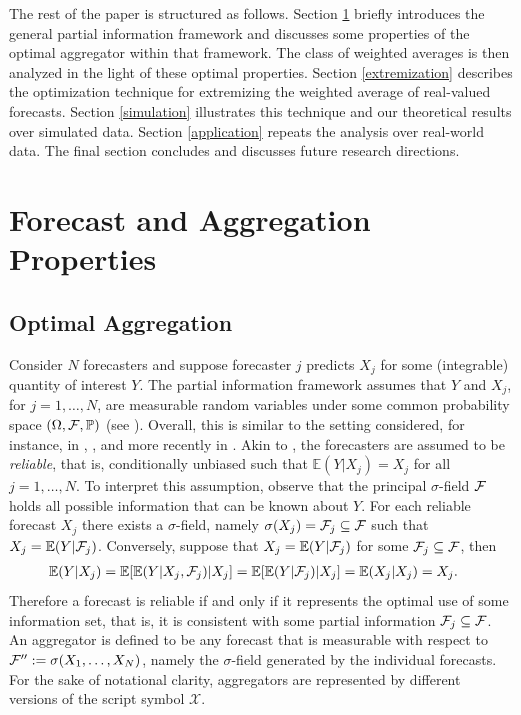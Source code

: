 \documentclass[11pt]{article}
\renewcommand{\P}{\mathbb{P}}
\newcommand{\E}{\mathbb{E}}
\theoremstyle{definition}
\theoremstyle{definition}
\def\F{{\cal F}}
\def\P{{\mathbb P}}
\def\E{{\mathbb E}}
\begin{document}
The rest of the paper is structured as follows. Section \ref{propertiesS} briefly
introduces the general partial information framework and discusses some properties of
the optimal aggregator within that framework. The class of weighted
averages is then analyzed in the light of these optimal
properties. Section \ref{extremization} describes the optimization technique for extremizing the weighted average of
real-valued forecasts. Section \ref{simulation} illustrates this
technique and our theoretical results over simulated
data. Section \ref{application} repeats the analysis over real-world data. The final section
concludes and discusses future research directions.

\section{Forecast and Aggregation Properties} \label{propertiesS}
\subsection{Optimal Aggregation}


Consider $N$ forecasters and suppose forecaster $j$ predicts $X_j$ for
some (integrable) quantity of interest $Y$.  The partial information
framework assumes that $Y$ and $X_j$, for $j = 1, \dots, N$, are
measurable random variables under some common probability space
$(\Omega, \F , \P)$ (see \citealt{satopaamodeling}). Overall, this is similar to the setting
considered, for instance,
in \cite{degroot1981assessing}, \cite{murphy1987general}, and more
recently in \cite{Ranjan08}. Akin to \cite{Ranjan08}, the forecasters
are assumed to be \textit{reliable}, that is, conditionally unbiased
such that $\E(Y | X_j) = X_j$ for all $j = 1, \dots, N$.  To interpret
this assumption, observe that the principal $\sigma$-field $\F$ holds
all possible information that can be known about $Y$. For each
reliable forecast $X_j$ there exists a $\sigma$-field, namely
$\sigma(X_j) = \F_j \subseteq \F$ such that $X_j
= \E(Y|\F_j)$. Conversely, suppose that $X_j = \E(Y|\F_j)$ for some
$\F_j \subseteq \F$, then
\begin{align*}
\E(Y | X_j) &= \E[\E(Y|X_j,\F_j)|X_j] = \E[\E(Y|\F_j)|X_j] = \E(X_j|X_j) = X_j.
\end{align*}
Therefore a forecast is reliable if and only if it represents the optimal use of some information set, that is, it is consistent with some partial information $\F_j \subseteq \F$.
 An aggregator is defined to be any forecast that is measurable with respect to $\F'' := \sigma(X_1, \dots, X_N)$, namely the $\sigma$-field generated by the individual forecasts. For the sake of notational clarity, aggregators are represented by different versions of the script symbol $\mathcal{X}$.
\end{document}
